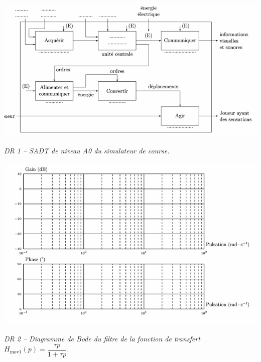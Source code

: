 \documentclass[10pt,fleqn]{article} %
\begin{document}
 
\newpage 


\begin{center}
\includegraphics[width=.9\linewidth]{images/DR_01}

\textit{DR 1 -- SADT de niveau A0 du simulateur de course.}
\end{center}

\begin{center}
\includegraphics[width=.9\linewidth]{images/DR_02}

\textit{DR 2 -- Diagramme de Bode du filtre de la fonction de transfert $H_{\text{mov1}}(p)=\dfrac{\tau p}{1+\tau p}$.}
\end{center}
\end{document}
